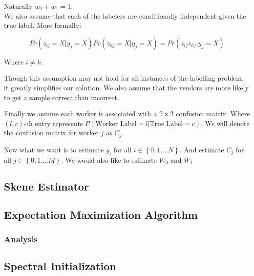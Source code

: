 \documentclass{article}
\begin{document}
Naturally $w_{0} + w_{1} = 1$. \\

We also assume that each of the labelers are conditionally independent given the true label. More formally:

$$Pr(z_{ij} = X | y_{j} = X)Pr(z_{hj} = X | y_{j} = X) = Pr(z_{ij}z_{hj} | y_{j} = X)$$

Where $i \neq h$.

Though this assumption may not hold for all instances of the labelling problem, it greatly simplifies our solution. We also assume that the vendors are more likely to get a sample correct than incorrect. 

Finally we assume each worker is associated with a $2 \times 2$ confusion matrix. Where $(l,c)$-th entry represents $P(\text{Worker Label} = l| \text{True Label} = c)$. We will denote the confusion matrix for worker $j$ as  $C_{j}$. 

Now what we want is to estimate $y_{i}$ for all $i \in \left\{0,1....N\right\}$. And estimate $C_{j}$ for all $j \in \left\{0,1....M\right\}$. We would also like to estimate $W_{0}$ and $W_{1}$



\subsection{Skene Estimator}


\subsection{Expectation Maximization Algorithm}
\subsubsection{Analysis}

\subsection{Spectral Initialization}













\end{document}
